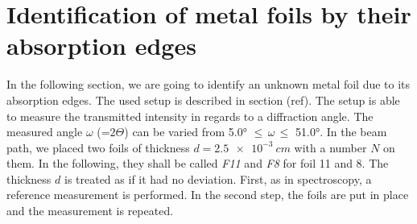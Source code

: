 \section{Identification of metal foils by their absorption edges}
\label{sec:absorb}

In the following section, we are going to identify an unknown metal foil due to its absorption edges. The used setup is described in section (ref).
The setup is able to measure the transmitted intensity in regards to a diffraction angle. The measured angle $\omega$ (=$2\Theta$) can be varied from 
5.0° $\leqslant \, \omega \, \leqslant$ 51.0°. In the beam path, we placed two foils of thickness $d = \SI{2.5e-3}{cm}$ with a number $N$ on them. In the following, they shall be called \textit{F11} and \textit{F8} for foil 11 and 8.
The thickness $d$ is treated as if it had no deviation. First, as in spectroscopy, a reference measurement is performed. In the 
second step, the foils are put in place and the measurement is repeated. 

